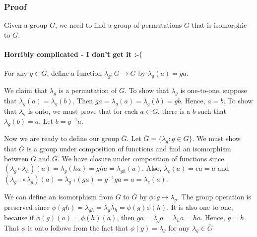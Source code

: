 \subsubsection{Proof}\label{proof}

Given a group \(G\), we need to find a group of permutations \(\bar{G}\)
that is isomorphic to \(G\).

\paragraph{Horribly complicated - I don't get it
:-(}\label{horribly-complicated---i-dont-get-it--}

For any \(g \in G\), define a function \(\lambda_g : G \rightarrow G\)
by \(\lambda_g(a) = ga\).

We claim that \(\lambda_g\) is a permutation of \(G\). To show that
\(\lambda_g\) is one-to-one, suppose that
\(\lambda_g(a) = \lambda_g(b)\). Then
\(ga =\lambda_g(a) = \lambda_g(b) = gb\). Hence, \(a = b\). To show that
\(\lambda_g\) is onto, we must prove that for each \(a \in G\), there is
a \(b\) such that \(\lambda_g (b) = a\). Let \(b = g^{-1} a\).

Now we are ready to define our group \(\overline{G}\). Let
\(\overline{G} = \{ \lambda_g : g \in G \}\). We must show that
\(\overline{G}\) is a group under composition of functions and find an
isomorphism between \(G\) and \(\overline{G}\). We have closure under
composition of functions since
\((\lambda_g \circ \lambda_h)(a) = \lambda_g(ha) = gha = \lambda_{gh}(a)\).
Also, \(\lambda_e (a) = ea = a\) and
\((\lambda_{g^{-1}} \circ \lambda_g) (a) = \lambda_{g^{-1}} (ga) = g^{-1} g a = a = \lambda_e(a)\).

We can define an isomorphism from \(G\) to \(\overline{G}\) by
\(\phi : g \mapsto \lambda_g\). The group operation is preserved since
\(\phi(gh) = \lambda_{gh} = \lambda_g \lambda_h = \phi(g) \phi(h)\). It
is also one-to-one, because if \(\phi(g)(a) = \phi(h)(a)\), then
\(ga = \lambda_g a = \lambda_h a= ha\). Hence, \(g = h\). That \(\phi\)
is onto follows from the fact that \(\phi( g ) = \lambda_g\) for any
\(\lambda_g \in \overline{G}\)
